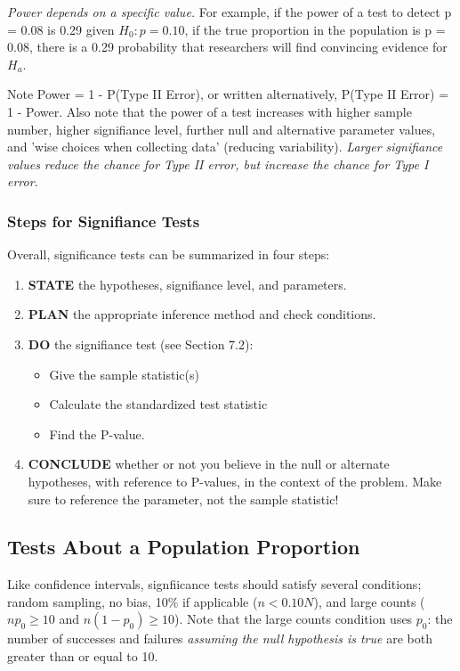 \documentclass[12pt, a4paper]{article}
\theoremstyle{definition}
\begin{document}
\textit{Power depends on a specific value.} For example, if the power of a test to detect p = 0.08 is 0.29 given $H_0: p = 0.10$, if the true proportion in the population is p = 0.08, there is a 0.29 probability that researchers will find convincing evidence for $H_a$.

Note Power = 1 - P(Type II Error), or written alternatively, P(Type II Error) = 1 - Power. Also note that the power of a test increases with higher sample number, higher signifiance level, further null and alternative parameter values, and 'wise choices when collecting data' (reducing variability).
\textit{Larger signifiance values reduce the chance for Type II error, but increase the chance for Type I error.}

\subsubsection{Steps for Signifiance Tests}
Overall, significance tests can be summarized in four steps:
\begin{enumerate}
    \item \textbf{STATE} the hypotheses, signifiance level, and parameters.
    \item \textbf{PLAN} the appropriate inference method and check conditions.
    \item \textbf{DO} the signifiance test (see Section 7.2): \begin{itemize}
        \item Give the sample statistic(s)
        \item Calculate the standardized test statistic
        \item Find the P-value.
    \end{itemize}
    \item \textbf{CONCLUDE} whether or not you believe in the null or alternate hypotheses, with reference to P-values, in the context of the problem. Make sure to reference the parameter, not the sample statistic!
\end{enumerate}

\subsection{Tests About a Population Proportion}

Like confidence intervals, signfiicance tests should satisfy several conditions; random sampling, no bias, 10\% if applicable ($n < 0.10N$), and large counts ($np_0 \geq 10$ and $n(1-p_0) \geq 10$).
Note that the large counts condition uses $p_0$: the number of successes and failures \textit{assuming the null hypothesis is true} are both greater than or equal to 10.
\end{document}
